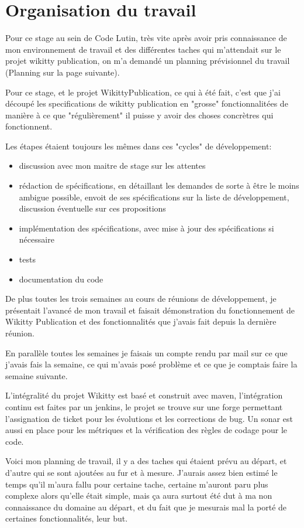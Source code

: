 \section{Organisation du travail}

Pour ce stage au sein de Code Lutin, très vite après avoir pris connaissance 
de mon environnement de travail et des différentes taches qui m'attendait sur
le projet wikitty publication, on m'a demandé un planning prévisionnel du travail
(Planning sur la page suivante).

Pour ce stage, et le projet WikittyPublication, ce qui à été fait, c'est que 
j'ai découpé les specifications de wikitty publication en "grosse" fonctionnalitées
de manière à ce que "régulièrement" il puisse y avoir des choses concrètres qui 
fonctionnent.

Les étapes étaient toujours les mêmes dans ces "cycles" de développement:
\begin{itemize}
\item discussion avec mon maitre de stage sur les attentes
\item rédaction de spécifications, en détaillant les demandes de sorte à être
le moins ambigue possible, envoit de ses spécifications sur la liste de 
développement, discussion éventuelle sur ces propositions
\item implémentation des spécifications, avec mise à jour des spécifications 
si nécessaire
\item tests
\item documentation du code
\end{itemize}

De plus toutes les trois semaines au cours de réunions de développement, je 
présentait l'avancé de mon travail et faisait démonstration du fonctionnement
de Wikitty Publication et des fonctionnalités que j'avais fait depuis la dernière
réunion.

En parallèle toutes les semaines je faisais un compte rendu par mail sur ce que 
j'avais fais la semaine, ce qui m'avais posé problème et ce que je comptais faire
la semaine suivante. 

L'intégralité du projet Wikitty est basé et construit avec maven, l'intégration
continu est faites par un jenkins, le projet se trouve sur une forge permettant
l'assignation de ticket pour les évolutions et les corrections de bug. 
Un sonar est aussi en place pour les métriques et la vérification des règles
de codage pour le code.

Voici mon planning de travail, il y a des taches qui étaient prévu au départ,
et d'autre qui se sont ajoutées au fur et à mesure. J'aurais assez bien estimé
le temps qu'il m'aura fallu pour certaine tache, certaine m'auront paru plus 
complexe alors qu'elle était simple, mais ça aura surtout été dut à ma non 
connaissance du domaine au départ, et du fait que je mesurais mal la porté
de certaines fonctionnalités, leur but.

 


